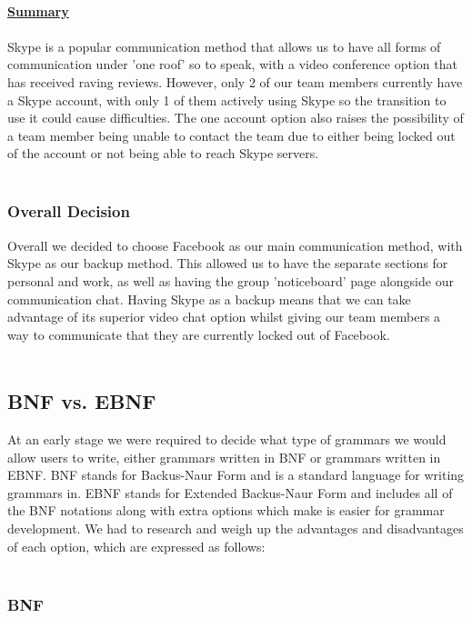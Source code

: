 \\
\textbf {\underline{Summary}}\\
\\
Skype is a popular communication method that allows us to have all forms of communication under 'one roof' so to speak, with a video conference option that has received raving reviews. However, only 2 of our team members currently have a Skype account, with only 1 of them actively using Skype so the transition to use it could cause difficulties. The one account option also raises the possibility of a team member being unable to contact the team due to either being locked out of the account or not being able to reach Skype servers.\\
\\
\subsubsection{Overall Decision}
Overall we decided to choose Facebook as our main communication method, with Skype as our backup method. This allowed us to have the separate sections for personal and work, as well as having the group 'noticeboard' page alongside our communication chat. Having Skype as a backup means that we can take advantage of its superior video chat option whilst giving our team members a way to communicate that they are currently locked out of Facebook. \\
\\

\subsection{BNF vs. EBNF}
At an early stage we were required to decide what type of grammars we would allow users to write, either grammars written in BNF or grammars written in EBNF. BNF stands for Backus-Naur Form and is a standard language for writing grammars in. EBNF stands for Extended Backus-Naur Form and includes all of the BNF notations along with extra options which make is easier for grammar development. We had to research and weigh up the advantages and disadvantages of each option, which are expressed as follows:\\
\\
\subsubsection{BNF}

